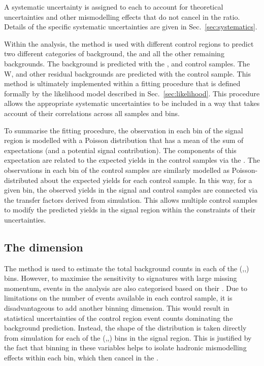 A systematic uncertainty is assigned to each \TF to account for
theoretical uncertainties and other mismodelling effects that do not
cancel in the ratio. Details of the specific systematic uncertainties
are given in Sec.~\ref{sec:systematics}.

Within the analysis, the \TF method is used with different control
regions to predict two different categories of background, the \znunu
and all the other remaining backgrounds. The \znunu background is
predicted with the \mmj, \gj and \mj control samples. The W, \ttbar and other residual
backgrounds are predicted with the \mj control sample. This method is
ultimately implemented within a fitting procedure that is defined
formally by the likelihood model described in
Sec.~\ref{sec:likelihood}. This procedure allows the appropriate
systematic uncertainties to be included in a way that takes account of
their correlations across all samples and bins.

To summarise the fitting procedure, the observation in each bin of the
signal region is modelled with a Poisson distribution that has a mean
of the sum of \SM expectations (and a potential signal contribution).
The components of this \SM expectation are related to the expected
yields in the control samples via the \TFs. The observations in each
bin of the control samples are similarly modelled as
Poisson-distributed about the expected yields for each control sample.
In this way, for a given bin, the observed yields in the signal and
control samples are connected via the transfer factors derived from
simulation.  This allows multiple control samples to modify the
predicted yields in the signal region within the constraints of their
uncertainties.

\subsection{The \MHT dimension}
\label{sec:mhtDim}

The \TF method is used to estimate the total background counts in each
of the (\HT,\nj,\nb) bins. However, to maximise the sensitivity to
\BSM signatures with large missing momentum, events in the analysis are also
categorised based on their \MHT. Due to limitations on the
number of events available in each control sample, it is
disadvantageous to add another binning
dimension. This would result in statistical uncertainties of the
control region event counts dominating the background prediction.
Instead, the shape of the \MHT distribution is taken directly from
simulation for each of the (\HT,\nj,\nb) bins in the signal region.
This is justified by the fact that binning in these variables helps to
isolate hadronic mismodelling effects within each bin, which then
cancel in the \TFs. 

